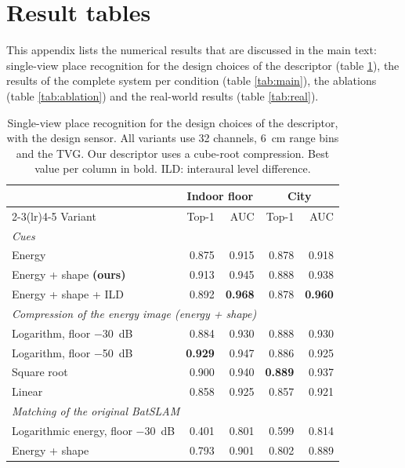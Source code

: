 \section{Result tables}
\label{app:tables}
This appendix lists the numerical results that are discussed in the main text: single-view place recognition for the design choices of the descriptor (table \ref{tab:descriptor}), the results of the complete system per condition (table \ref{tab:main}), the ablations (table \ref{tab:ablation}) and the real-world results (table \ref{tab:real}).

\begin{table}[t]
\centering
\footnotesize
\caption{Single-view place recognition for the design choices of the descriptor, with the design sensor. All variants use 32 channels, \SI{6}{\centi\meter} range bins and the TVG. Our descriptor uses a cube-root compression. Best value per column in bold. ILD: interaural level difference.}
\label{tab:descriptor}
\begin{tabular}{lrrrr}
\toprule
 & \multicolumn{2}{c}{Indoor floor} & \multicolumn{2}{c}{City} \\
\cmidrule(lr){2-3}\cmidrule(lr){4-5}
Variant & Top-1 & AUC & Top-1 & AUC \\
\midrule
\multicolumn{5}{l}{\textit{Cues}} \\
Energy & 0.875 & 0.915 & 0.878 & 0.918 \\
Energy + shape \textbf{(ours)} & 0.913 & 0.945 & 0.888 & 0.938 \\
Energy + shape + ILD & 0.892 & \textbf{0.968} & 0.878 & \textbf{0.960} \\
\midrule
\multicolumn{5}{l}{\textit{Compression of the energy image (energy + shape)}} \\
Logarithm, floor \SI{-30}{\deci\bel} & 0.884 & 0.930 & 0.888 & 0.930 \\
Logarithm, floor \SI{-50}{\deci\bel} & \textbf{0.929} & 0.947 & 0.886 & 0.925 \\
Square root & 0.900 & 0.940 & \textbf{0.889} & 0.937 \\
Linear & 0.858 & 0.925 & 0.857 & 0.921 \\
\midrule
\multicolumn{5}{l}{\textit{Matching of the original BatSLAM}} \\
Logarithmic energy, floor \SI{-30}{\deci\bel} & 0.401 & 0.801 & 0.599 & 0.814 \\
Energy + shape & 0.793 & 0.901 & 0.802 & 0.889 \\
\bottomrule
\end{tabular}
\end{table}

